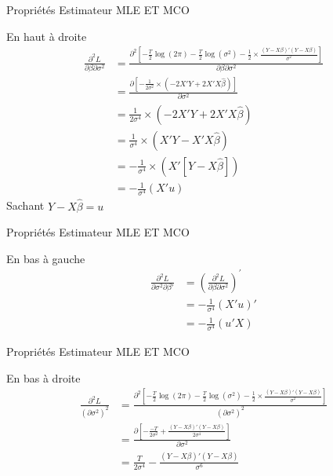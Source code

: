\documentclass{beamer}
\begin{document}
\begin{frame}{Propriétés Estimateur MLE ET MCO}
\begin{block}{En haut à droite}
\begin{align*}
\frac{\partial^2 L}{\partial \beta \partial \sigma^2} & =\frac{\partial^2 \left[ -\frac{T}{2} \log (2 \pi) -\frac{T}{2} \log (\sigma^2)-\frac{1}{2} \times \frac{(Y-X \beta)'(Y-X \beta)}{\sigma^2} \right]}{\partial \beta \partial \sigma^2}  \\ & = \frac{\partial \left[-\frac{1}{2 \sigma^2} \times (-2X'Y+2X'X \hat{\beta}) \right]}{\partial \sigma^2} \\ & = \frac{1}{2 \sigma^4} \times (-2X'Y + 2X'X\hat{\beta}) \\ & = \frac{1}{\sigma^4} \times (X'Y -X'X \hat{\beta}) \\ &= -\frac{1}{\sigma^4} \times (X'[Y-X \hat{\beta}]) \\ & = -\frac{1}{\sigma^4}(X'u)
\end{align*}
Sachant $Y-X \hat{\beta}=u$

\end{block}

\end{frame}

\begin{frame}{Propriétés Estimateur MLE ET MCO}
\begin{block}{En bas à gauche}
\begin{align*}
\frac{\partial^2 L}{\partial \sigma^2 \partial \beta'} & = \left( \frac{\partial^2 L}{\partial \beta \partial \sigma^2}\right)^{'} \\ & = -\frac{1}{\sigma^4}(X'u)' \\ & = -\frac{1}{\sigma^4}(u'X)
\end{align*}
\end{block}
\end{frame}

\begin{frame}{Propriétés Estimateur MLE ET MCO}
\begin{block}{En bas à droite}
\begin{align*}
\frac{\partial^2 L}{(\partial \sigma^2)^2} & = \frac{\partial^2 \left[ -\frac{T}{2} \log (2 \pi) -\frac{T}{2} \log (\sigma^2)-\frac{1}{2} \times \frac{(Y-X \beta)'(Y-X \beta)}{\sigma^2} \right]}{(\partial \sigma^2)^2} \\ & = \frac{\partial \left[-\frac{-T}{2 \sigma^2}+\frac{(Y-X \beta)'(Y-X \beta)}{2\sigma^4} \right]}{\partial \sigma^2} \\ & = \frac{T}{2 \sigma^4} - \frac{(Y-X\beta)'(Y-X \beta)}{\sigma^6}
\end{align*}
\end{block}
\end{frame}
\end{document}
